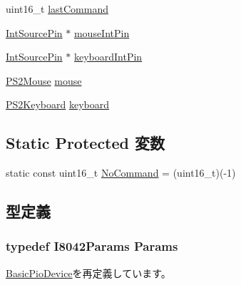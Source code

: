 \begin{DoxyCompactItemize}
\item 
uint16\_\-t \hyperlink{classX86ISA_1_1I8042_a0db1139e4bbd0a84a125c3aec0cb4334}{lastCommand}
\item 
\hyperlink{classX86ISA_1_1IntSourcePin}{IntSourcePin} $\ast$ \hyperlink{classX86ISA_1_1I8042_a43567e6650dc601b0bdbb359a639d974}{mouseIntPin}
\item 
\hyperlink{classX86ISA_1_1IntSourcePin}{IntSourcePin} $\ast$ \hyperlink{classX86ISA_1_1I8042_a93c7118e433fc446924c13e65a718473}{keyboardIntPin}
\item 
\hyperlink{classX86ISA_1_1PS2Mouse}{PS2Mouse} \hyperlink{classX86ISA_1_1I8042_ab174297071ac5e00a17024b3ea4489a8}{mouse}
\item 
\hyperlink{classX86ISA_1_1PS2Keyboard}{PS2Keyboard} \hyperlink{classX86ISA_1_1I8042_a4d45508aaea1af22f73cbd9fa5525f33}{keyboard}
\end{DoxyCompactItemize}
\subsection*{Static Protected 変数}
\begin{DoxyCompactItemize}
\item 
static const uint16\_\-t \hyperlink{classX86ISA_1_1I8042_afa7b02fd8bda5e1de413e0b8776294ad}{NoCommand} = (uint16\_\-t)(-\/1)
\end{DoxyCompactItemize}


\subsection{型定義}
\hypertarget{classX86ISA_1_1I8042_ae70fe038127f3e2a71a81dde45f38dc5}{
\subsubsection[{Params}]{\setlength{\rightskip}{0pt plus 5cm}typedef I8042Params {\bf Params}}}
\label{classX86ISA_1_1I8042_ae70fe038127f3e2a71a81dde45f38dc5}


\hyperlink{classBasicPioDevice_a2845515ac6467f10540747053c8a0449}{BasicPioDevice}を再定義しています。

